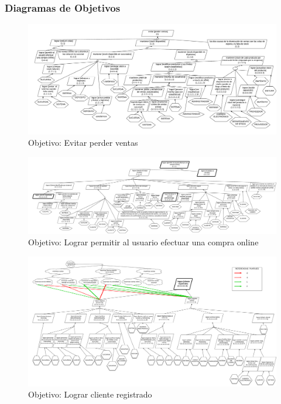 \subsubsection{Diagramas de Objetivos}
\vspace{-10em}
\begin{figure}[ht]\begin{center}
  \includegraphics[angle=90,height=.9\textheight]{tp1/images/objetivos-raiz.pdf}
  \caption{Objetivo: Evitar perder ventas}
\end{center}\end{figure}

\begin{figure}[ht]\begin{center}
  \includegraphics[angle=90,height=.9\textheight]{tp1/images/objetivos-operacion-online.pdf}
  \caption{Objetivo: Lograr permitir al usuario efectuar una compra online}
\end{center}\end{figure}

\begin{figure}[ht]\begin{center}
  \includegraphics[angle=90,height=.9\textheight]{tp1/images/objetivos-cliente-registrado.pdf}
  \caption{Objetivo: Lograr cliente registrado}
\end{center}\end{figure}

